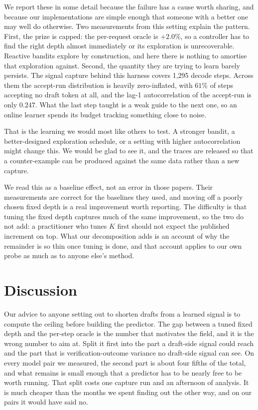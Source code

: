 \documentclass[conference]{IEEEtran}
\begin{document}
We report these in some detail because the failure has a cause worth sharing, and because our
implementations are simple enough that someone with a better one may well do otherwise. Two
measurements from this setting explain the pattern. First, the prize is capped: the
per-request oracle is $+2.0\%$, so a controller has to find the right depth almost immediately
or its exploration is unrecoverable. Reactive bandits explore by construction, and here there
is nothing to amortise that exploration against. Second, the quantity they are trying to learn
barely persists. The signal capture behind this harness covers 1{,}295 decode steps. Across
them the accept-run distribution is heavily zero-inflated, with $61\%$ of steps accepting no
draft token at all, and the lag-1 autocorrelation of the accept-run is only $0.247$. What the
last step taught is a weak guide to the next one, so an online learner spends its budget
tracking something close to noise.

That is the learning we would most like others to test. A stronger bandit, a better-designed
exploration schedule, or a setting with higher autocorrelation might change this. We would be
glad to see it, and the traces are released so that a counter-example can be produced against
the same data rather than a new capture.

We read this as a baseline effect, not an error in those papers. Their measurements are
correct for the baselines they used, and moving off a poorly chosen fixed depth is a real
improvement worth reporting. The difficulty is that tuning the fixed depth captures much of
the same improvement, so the two do not add: a practitioner who tunes $K$ first should not
expect the published increment on top. What our decomposition adds is an account of why the
remainder is so thin once tuning is done, and that account applies to our own probe as much as
to anyone else's method.

\section{Discussion}
Our advice to anyone setting out to shorten drafts from a learned signal is to compute the
ceiling before building the predictor. The gap between a tuned fixed depth and the per-step
oracle is the number that motivates the field, and it is the wrong number to aim at. Split it
first into the part a draft-side signal could reach and the part that is verification-outcome
variance no draft-side signal can see. On every model pair we measured, the second part is
about four fifths of the total, and what remains is small enough that a predictor has to be
nearly free to be worth running. That split costs one capture run and an afternoon of
analysis. It is much cheaper than the months we spent finding out the other way, and on our
pairs it would have said no.
\end{document}
